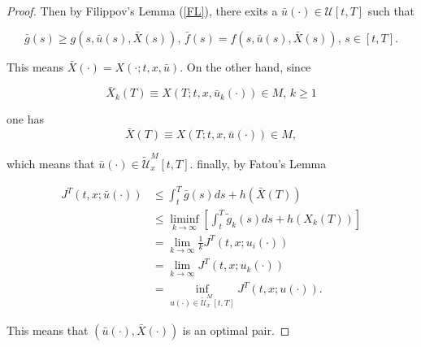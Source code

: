 \begin{proof}
        Then by Filippov's Lemma (\ref{FL}), there exits a $\bar{u}(\cdot)\in \mathcal{U}[t,T]$ such that
        
        $$\bar{g}(s)\geq g(s,\bar{u}(s),\bar{X}(s)),\,\bar{f}(s)=f(s,\bar{u}(s),\bar{X}(s)),\, s\in [t,T].$$
        
        This means $\bar{X}(\cdot)=X(\cdot;t,x,\bar{u})$. On the other hand, since
        
        $$\bar{X}_k(T)\equiv X(T;t,x,\bar{u}_k(\cdot))\in M,\, k\geq 1$$
        
        one has 
        $$\bar{X}(T)\equiv X(T;t,x,\bar{u}(\cdot))\in M,$$
        
        which means that $\bar{u}(\cdot)\in \tilde{\mathcal{U}}^M_x[t,T]$. finally, by Fatou's Lemma
        
        \begin{eqnarray*}
            J^T(t,x;\bar{u}(\cdot))%
            &\leq \int_{t}^{T}\bar{g}(s)ds +h(\bar{X}(T))\\
            &\leq \liminf_{k\to \infty}[\int_{t}^{T}\tilde{g}_k(s)ds + h(X_k(T))]\\
            &=  \lim_{k\to \infty} \frac{1}{k}  J^T(t,x;u_i(\cdot))\\
            &=  \lim_{k\to \infty} J^T(t,x;u_k(\cdot))\\
            &=  \inf_{u(\cdot)\in\tilde{\mathcal{U}}^M_x[t,T]}J^T(t,x;u(\cdot)).
        \end{eqnarray*}
        
        This means that $(\bar{u}(\cdot),\bar{X}(\cdot))$ is an optimal pair.
    \end{proof}

